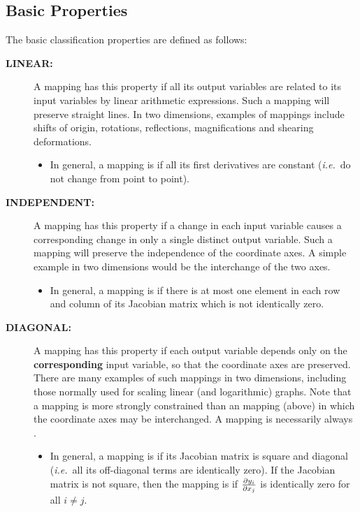\subsection{Basic Properties}

The basic classification properties are defined as follows:

\begin{description}

\item[{\bf LINEAR:}] A mapping has this property if all its output variables
are related to its input variables by linear arithmetic expressions. 
Such a mapping will preserve straight lines. 
In two dimensions, examples of  mappings include shifts of
origin, rotations, reflections, magnifications and shearing deformations. 

\begin{itemize}
\item In general, a mapping is  if all its first derivatives
are constant ({\em i.e.}\ do not change from point to point). 
\end{itemize}

\item[{\bf INDEPENDENT:}] A mapping has this property if a change in each
input variable causes a corresponding change in only a single distinct
output variable. 
Such a mapping will preserve the independence of the coordinate axes.
A simple example in two dimensions would be the interchange of the two axes.

\begin{itemize}
\item In general, a mapping is  if there is at most one
element in each row and column of its Jacobian matrix which is not
identically zero. 
\end{itemize}

\item[{\bf DIAGONAL:}] A mapping has this property if each output variable
depends only on the {\bf corresponding} input variable, so that the
coordinate axes are preserved. 
There are many examples of such mappings in two dimensions, including those
normally used for scaling linear (and logarithmic) graphs. 
Note that a  mapping is more strongly constrained than an
 mapping (above) in which the coordinate axes may be
interchanged.
A  mapping is necessarily always .

\begin{itemize}
\item In general, a mapping is  if its Jacobian matrix is
square and diagonal ({\em i.e.}\ all its off-diagonal terms are identically
zero). 
If the Jacobian matrix is not square, then the mapping is  if
$\frac{\partial y_{i}}{\partial x_{j}}$ is identically zero for all \mbox{$i \ne j$}. 
\end{itemize}


\end{description}
